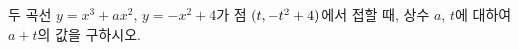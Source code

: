 두 곡선 $y=x^3+ax^2$, $y=-x^2+4$가 점 $(t{,}\mkern3mu\mathopen{}-t^2+4)$에서 접할 때, 상수 $a$, $t$에 대하여 $a+t$의 값을 구하시오.
